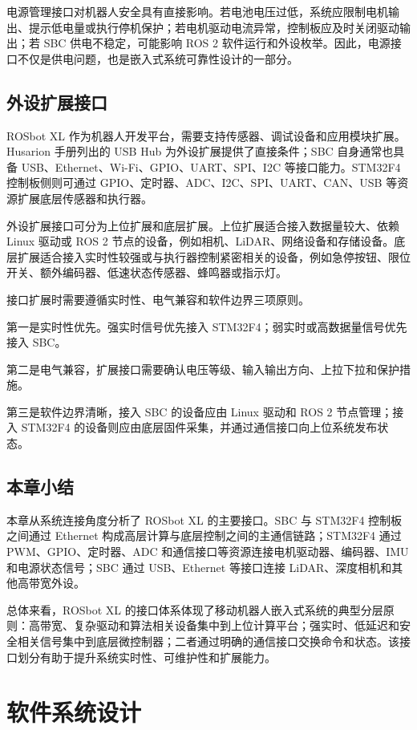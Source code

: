 \documentclass[UTF8,a4paper,12pt]{ctexrep}
\begin{document}
电源管理接口对机器人安全具有直接影响。若电池电压过低，系统应限制电机输出、提示低电量或执行停机保护；若电机驱动电流异常，控制板应及时关闭驱动输出；若 SBC 供电不稳定，可能影响 ROS 2 软件运行和外设枚举。因此，电源接口不仅是供电问题，也是嵌入式系统可靠性设计的一部分。

\section{外设扩展接口}

ROSbot XL 作为机器人开发平台，需要支持传感器、调试设备和应用模块扩展。Husarion 手册列出的 USB Hub 为外设扩展提供了直接条件；SBC 自身通常也具备 USB、Ethernet、Wi-Fi、GPIO、UART、SPI、I2C 等接口能力。STM32F4 控制板侧则可通过 GPIO、定时器、ADC、I2C、SPI、UART、CAN、USB 等资源扩展底层传感器和执行器。

外设扩展接口可分为上位扩展和底层扩展。上位扩展适合接入数据量较大、依赖 Linux 驱动或 ROS 2 节点的设备，例如相机、LiDAR、网络设备和存储设备。底层扩展适合接入实时性较强或与执行器控制紧密相关的设备，例如急停按钮、限位开关、额外编码器、低速状态传感器、蜂鸣器或指示灯。

接口扩展时需要遵循实时性、电气兼容和软件边界三项原则。

第一是实时性优先。强实时信号优先接入 STM32F4；弱实时或高数据量信号优先接入 SBC。

第二是电气兼容，扩展接口需要确认电压等级、输入输出方向、上拉下拉和保护措施。

第三是软件边界清晰，接入 SBC 的设备应由 Linux 驱动和 ROS 2 节点管理；接入 STM32F4 的设备则应由底层固件采集，并通过通信接口向上位系统发布状态。

\section{本章小结}

本章从系统连接角度分析了 ROSbot XL 的主要接口。SBC 与 STM32F4 控制板之间通过 Ethernet 构成高层计算与底层控制之间的主通信链路；STM32F4 通过 PWM、GPIO、定时器、ADC 和通信接口等资源连接电机驱动器、编码器、IMU 和电源状态信号；SBC 通过 USB、Ethernet 等接口连接 LiDAR、深度相机和其他高带宽外设。

总体来看，ROSbot XL 的接口体系体现了移动机器人嵌入式系统的典型分层原则：高带宽、复杂驱动和算法相关设备集中到上位计算平台；强实时、低延迟和安全相关信号集中到底层微控制器；二者通过明确的通信接口交换命令和状态。该接口划分有助于提升系统实时性、可维护性和扩展能力。

\chapter{软件系统设计}
\end{document}
